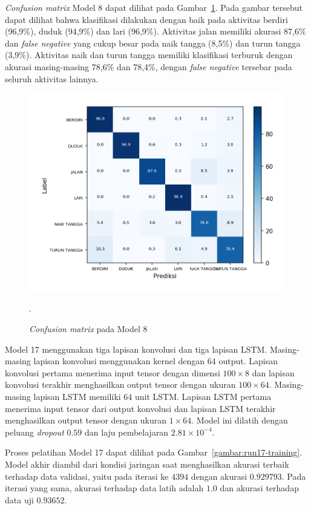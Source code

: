 \textit{Confusion matrix} Model 8 dapat dilihat pada Gambar~\ref{gambar:run8-confusion-martix}. Pada gambar tersebut dapat dilihat bahwa klasifikasi dilakukan dengan baik pada aktivitas berdiri (96,9\%), duduk (94,9\%) dan lari (96,9\%). Aktivitas jalan memiliki akurasi 87,6\% dan \textit{false negative} yang cukup besar pada naik tangga (8,5\%) dan turun tangga (3,9\%). Aktivitas naik dan turun tangga memiliki klasifikasi terburuk dengan akurasi masing-masing 78,6\% dan 78,4\%, dengan \textit{false negative} tersebar pada seluruh aktivitas lainnya.

\begin{figure}[h!]
    \centering
    \includegraphics[width=13cm]{gambar/hasil-pembahasan/run8-confusion-matrix.png}
    \caption{\textit{Confusion matrix} pada Model 8}.
    \label{gambar:run8-confusion-martix}
\end{figure}

Model 17 menggunakan tiga lapisan konvolusi dan tiga lapisan LSTM\@. Masing-masing lapisan konvolusi menggunakan kernel dengan $64$ output. Lapisan konvolusi pertama menerima input tensor dengan dimensi $100 \times 8$ dan lapisan konvolusi terakhir menghasilkan output tensor dengan ukuran $100 \times 64$. Masing-masing lapisan LSTM memiliki $64$ unit LSTM\@. Lapisan LSTM pertama menerima input tensor dari output konvolusi dan lapisan LSTM terakhir menghasilkan output tensor dengan ukuran $1 \times 64$. Model ini dilatih dengan peluang \textit{dropout} $0.59$ dan laju pembelajaran $2.81 \times 10^{-4}$.

Proses pelatihan Model 17 dapat dilihat pada Gambar~\ref{gambar:run17-training}. Model akhir diambil dari kondisi jaringan saat menghasilkan akurasi terbaik terhadap data validasi, yaitu pada iterasi ke $4394$ dengan akurasi $0.929793$. Pada iterasi yang sama, akurasi terhadap data latih adalah $1.0$ dan akurasi terhadap data uji  $0.93652$.

